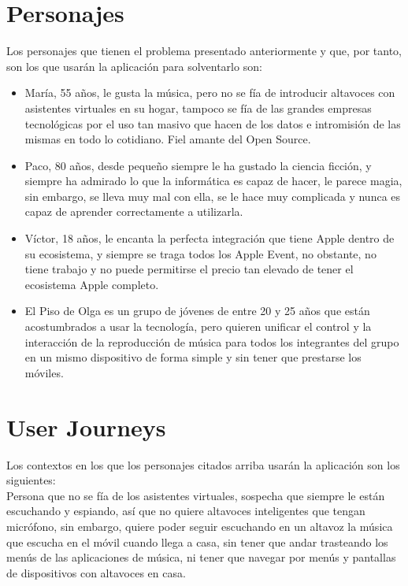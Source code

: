 \section{Personajes}
Los personajes que tienen el problema presentado anteriormente y que, por tanto, son los que usarán la aplicación para solventarlo son:
\begin{itemize}
    \item María, 55 años, le gusta la música, pero no se fía de introducir altavoces con asistentes virtuales en su hogar, tampoco se fía de las grandes empresas tecnológicas por el uso tan masivo que hacen de los datos e intromisión de las mismas en todo lo cotidiano. Fiel amante del Open Source.
    \item Paco, 80 años, desde pequeño siempre le ha gustado la ciencia ficción, y siempre ha admirado lo que la informática es capaz de hacer, le parece magia, sin embargo, se lleva muy mal con ella, se le hace muy complicada y nunca es capaz de aprender correctamente a utilizarla.
    \item Víctor, 18 años, le encanta la perfecta integración que tiene Apple dentro de su ecosistema, y siempre se traga todos los Apple Event, no obstante, no tiene trabajo y no puede permitirse el precio tan elevado de tener el ecosistema Apple completo.
    \item El Piso de Olga es un grupo de jóvenes de entre 20 y 25 años que están acostumbrados a usar la tecnología, pero quieren unificar el control y la interacción de la reproducción de música para todos los integrantes del grupo en un mismo dispositivo de forma simple y sin tener que prestarse los móviles.
\end{itemize}

\section{User Journeys}
Los contextos en los que los personajes citados arriba usarán la aplicación son los siguientes:\\

Persona que no se fía de los asistentes virtuales, sospecha que siempre le están escuchando y espiando, así que no quiere altavoces inteligentes que tengan micrófono, sin embargo, quiere poder seguir escuchando en un altavoz la música que escucha en el móvil cuando llega a casa, sin tener que andar trasteando los menús de las aplicaciones de música, ni tener que navegar por menús y pantallas de dispositivos con altavoces en casa.\\

